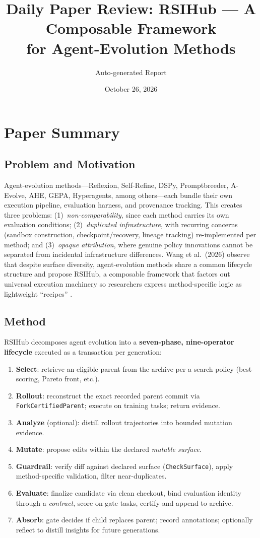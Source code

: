 \documentclass[11pt,a4paper]{article}
\title{Daily Paper Review: RSIHub --- A Composable Framework\\for Agent-Evolution Methods}
\author{Auto-generated Report}
\date{October 26, 2026}
\begin{document}
\maketitle

\section{Paper Summary}

\subsection{Problem and Motivation}
Agent-evolution methods---Reflexion, Self-Refine, DSPy, Promptbreeder, A-Evolve, AHE, GEPA, Hyperagents, among others---each bundle their own execution pipeline, evaluation harness, and provenance tracking. This creates three problems: (1)~\emph{non-comparability}, since each method carries its own evaluation conditions; (2)~\emph{duplicated infrastructure}, with recurring concerns (sandbox construction, checkpoint/recovery, lineage tracking) re-implemented per method; and (3)~\emph{opaque attribution}, where genuine policy innovations cannot be separated from incidental infrastructure differences. Wang et al.\ (2026) observe that despite surface diversity, agent-evolution methods share a common lifecycle structure and propose RSIHub, a composable framework that factors out universal execution machinery so researchers express method-specific logic as lightweight ``recipes'' \cite{wang2026rsihub}.

\subsection{Method}
RSIHub decomposes agent evolution into a \textbf{seven-phase, nine-operator lifecycle} executed as a transaction per generation:

\begin{enumerate}
  \item \textbf{Select}: retrieve an eligible parent from the archive per a search policy (best-scoring, Pareto front, etc.).
  \item \textbf{Rollout}: reconstruct the exact recorded parent commit via \texttt{ForkCertifiedParent}; execute on training tasks; return evidence.
  \item \textbf{Analyze} (optional): distill rollout trajectories into bounded mutation evidence.
  \item \textbf{Mutate}: propose edits within the declared \emph{mutable surface}.
  \item \textbf{Guardrail}: verify diff against declared surface (\texttt{CheckSurface}), apply method-specific validation, filter near-duplicates.
  \item \textbf{Evaluate}: finalize candidate via clean checkout, bind evaluation identity through a \emph{contract}, score on gate tasks, certify and append to archive.
  \item \textbf{Absorb}: gate decides if child replaces parent; record annotations; optionally reflect to distill insights for future generations.
\end{enumerate}
\end{document}
